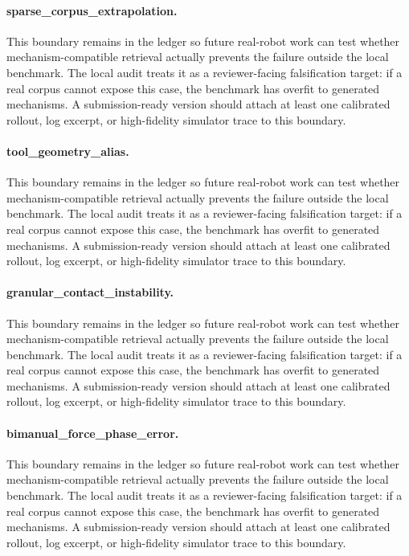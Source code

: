 \documentclass{article}
\begin{document}
\paragraph{sparse\_corpus\_extrapolation.} This boundary remains in the ledger so future real-robot work can test whether mechanism-compatible retrieval actually prevents the failure outside the local benchmark. The local audit treats it as a reviewer-facing falsification target: if a real corpus cannot expose this case, the benchmark has overfit to generated mechanisms. A submission-ready version should attach at least one calibrated rollout, log excerpt, or high-fidelity simulator trace to this boundary.
\paragraph{tool\_geometry\_alias.} This boundary remains in the ledger so future real-robot work can test whether mechanism-compatible retrieval actually prevents the failure outside the local benchmark. The local audit treats it as a reviewer-facing falsification target: if a real corpus cannot expose this case, the benchmark has overfit to generated mechanisms. A submission-ready version should attach at least one calibrated rollout, log excerpt, or high-fidelity simulator trace to this boundary.
\paragraph{granular\_contact\_instability.} This boundary remains in the ledger so future real-robot work can test whether mechanism-compatible retrieval actually prevents the failure outside the local benchmark. The local audit treats it as a reviewer-facing falsification target: if a real corpus cannot expose this case, the benchmark has overfit to generated mechanisms. A submission-ready version should attach at least one calibrated rollout, log excerpt, or high-fidelity simulator trace to this boundary.
\paragraph{bimanual\_force\_phase\_error.} This boundary remains in the ledger so future real-robot work can test whether mechanism-compatible retrieval actually prevents the failure outside the local benchmark. The local audit treats it as a reviewer-facing falsification target: if a real corpus cannot expose this case, the benchmark has overfit to generated mechanisms. A submission-ready version should attach at least one calibrated rollout, log excerpt, or high-fidelity simulator trace to this boundary.
\end{document}
